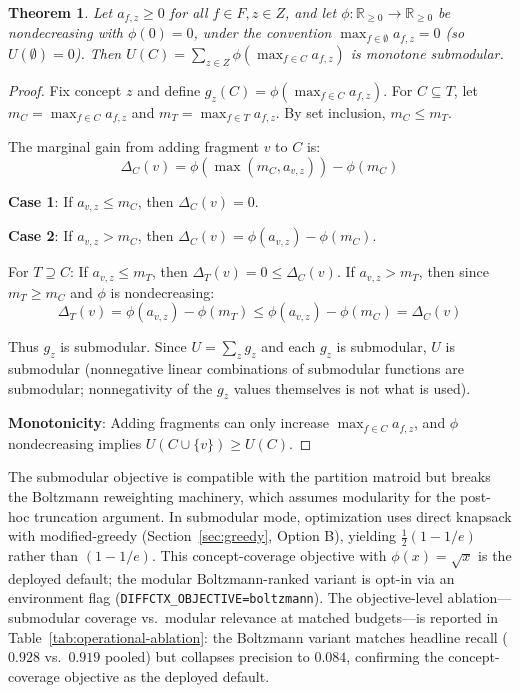 \documentclass[11pt, a4paper]{article}
\newtheorem{theorem}{Theorem}
\begin{document}
\begin{theorem}
Let $a_{f,z} \geq 0$ for all $f \in F, z \in Z$, and let $\phi: \mathbb{R}_{\geq 0} \to \mathbb{R}_{\geq 0}$ be nondecreasing with $\phi(0) = 0$, under the convention $\max_{f \in \emptyset} a_{f,z} = 0$ (so $U(\emptyset) = 0$). Then $U(C) = \sum_{z \in Z} \phi(\max_{f \in C} a_{f,z})$ is monotone submodular.
\end{theorem}

\begin{proof}
Fix concept $z$ and define $g_z(C) = \phi(\max_{f \in C} a_{f,z})$. For $C \subseteq T$, let $m_C = \max_{f \in C} a_{f,z}$ and $m_T = \max_{f \in T} a_{f,z}$. By set inclusion, $m_C \leq m_T$.

The marginal gain from adding fragment $v$ to $C$ is:
\[
\Delta_C(v) = \phi(\max(m_C, a_{v,z})) - \phi(m_C)
\]

\textbf{Case 1}: If $a_{v,z} \leq m_C$, then $\Delta_C(v) = 0$.

\textbf{Case 2}: If $a_{v,z} > m_C$, then $\Delta_C(v) = \phi(a_{v,z}) - \phi(m_C)$.

For $T \supseteq C$: If $a_{v,z} \leq m_T$, then $\Delta_T(v) = 0 \leq \Delta_C(v)$. If $a_{v,z} > m_T$, then since $m_T \geq m_C$ and $\phi$ is nondecreasing:
\[
\Delta_T(v) = \phi(a_{v,z}) - \phi(m_T) \leq \phi(a_{v,z}) - \phi(m_C) = \Delta_C(v)
\]

Thus $g_z$ is submodular. Since $U = \sum_z g_z$ and each $g_z$ is submodular, $U$ is submodular (nonnegative linear combinations of submodular functions are submodular; nonnegativity of the $g_z$ values themselves is not what is used).

\textbf{Monotonicity}: Adding fragments can only increase $\max_{f \in C} a_{f,z}$, and $\phi$ nondecreasing implies $U(C \cup \{v\}) \geq U(C)$.
\end{proof}

The submodular objective is compatible with the partition matroid but breaks the Boltzmann reweighting machinery, which assumes modularity for the post-hoc truncation argument. In submodular mode, optimization uses direct knapsack with modified-greedy (Section~\ref{sec:greedy}, Option B), yielding $\frac{1}{2}(1-1/e)$ rather than $(1-1/e)$. This concept-coverage objective with $\phi(x) = \sqrt{x}$ is the deployed default; the modular Boltzmann-ranked variant is opt-in via an environment flag (\texttt{DIFFCTX\_OBJECTIVE=boltzmann}). The objective-level ablation---submodular coverage vs.\ modular relevance at matched budgets---is reported in Table~\ref{tab:operational-ablation}: the Boltzmann variant matches headline recall ($0.928$ vs.\ $0.919$ pooled) but collapses precision to $0.084$, confirming the concept-coverage objective as the deployed default.
\end{document}
